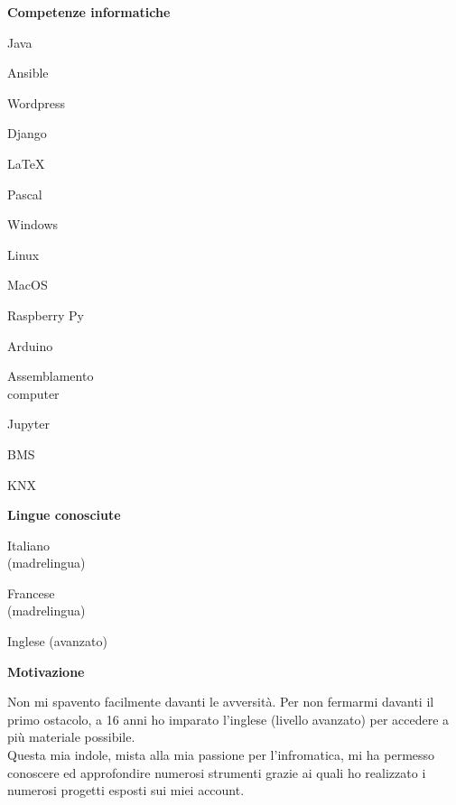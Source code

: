 \documentclass[a4paper,12pt,final]{memoir}
\newcommand{\Sep}{\vspace{1.5em}}
\newcommand{\SmallSep}{\vspace{0.5em}}
\newcommand{\CVSection}[1]
	{\Large\textbf{#1}\par
	\SmallSep\normalsize\normalfont}
\newcommand{\CVItem}[1]
	{\textbf{\color{RoyalBlue} #1}}
\begin{document}
\CVItem{Competenze informatiche}
\begin{multicols}{3}
\begin{compactitem}[\color{RoyalBlue}$\circ$]
	\item Java
	\item Ansible
	\item Wordpress
	\item Django
	\item \LaTeX
	\item Pascal
	\item Windows
	\item Linux
	\item MacOS
	\item Raspberry Py
	\item Arduino
	\item Assemblamento\\computer
	\item Jupyter
	\item BMS
	\item KNX
\end{compactitem}
\end{multicols}
\SmallSep

\CVItem{Lingue conosciute}
\begin{multicols}{3}
\begin{compactitem}[\color{RoyalBlue}$\circ$]
	\item Italiano\\(madrelingua)
	\item Francese\\(madrelingua)
	\item Inglese (avanzato)
\end{compactitem}
\end{multicols}
\Sep 

\CVSection{Motivazione}
	Non mi spavento facilmente davanti le avversità.
	Per non fermarmi davanti il primo ostacolo, a 16 anni ho imparato l'inglese (livello avanzato) per accedere a più materiale possibile.
	\\Questa mia indole, mista alla mia passione per l'infromatica, mi ha permesso conoscere ed approfondire numerosi strumenti 
	grazie ai quali ho realizzato i numerosi progetti esposti sui miei account.
\end{document}
